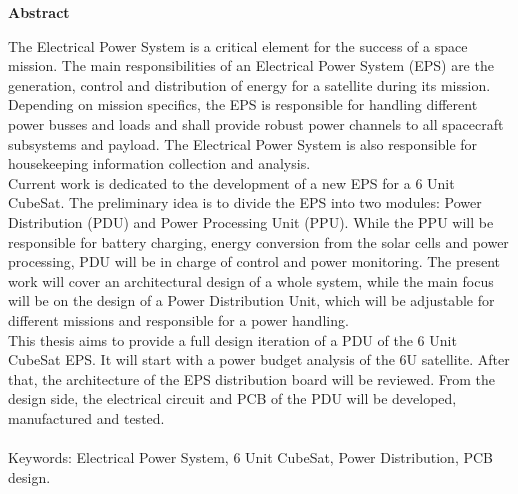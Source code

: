 \thispagestyle{empty}
\vspace*{1.0cm}

\begin{center}
    \textbf{Abstract}
\end{center}

\vspace*{0.5cm}

\noindent

The Electrical Power System is a critical element for the success of a space mission. The main responsibilities of an Electrical Power System (EPS) are the generation, control and distribution of energy for a satellite during its mission. Depending on mission specifics, the EPS is responsible for handling different power busses and loads and shall provide robust power channels to all spacecraft subsystems and payload. The Electrical Power System is also responsible for housekeeping information collection and analysis. 
\\

Current work is dedicated to the development of a new EPS for a 6 Unit CubeSat. The preliminary idea is to divide the EPS into two modules: Power Distribution (PDU) and Power Processing Unit (PPU). While the PPU will be responsible for battery charging, energy conversion from the solar cells and power processing, PDU will be in charge of control and power monitoring. The present work will cover an architectural design of a whole system, while the main focus will be on the design of a Power Distribution Unit, which will be adjustable for different missions and responsible for a power handling.
\\

This thesis aims to provide a full design iteration of a PDU of the 6 Unit CubeSat EPS. It will start with a power budget analysis of the 6U satellite. After that, the architecture of the EPS distribution board will be reviewed. From the design side, the electrical circuit and PCB of the PDU will be developed, manufactured and tested.
\\
\\
Keywords: Electrical Power System, 6 Unit CubeSat, Power Distribution, PCB design.